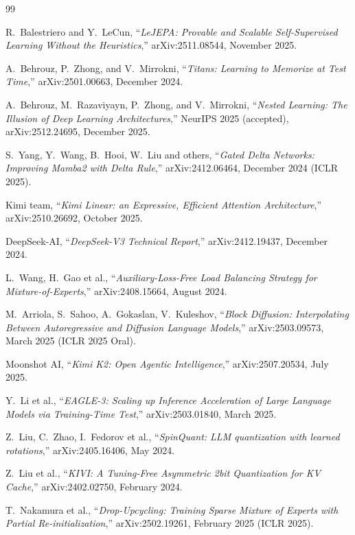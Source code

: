 \documentclass[10pt,a4paper]{article}
\theoremstyle{remark}
\begin{document}
\begin{thebibliography}{99}

R.~Balestriero and Y.~LeCun,
``\emph{LeJEPA: Provable and Scalable Self-Supervised Learning Without
the Heuristics},''
arXiv:2511.08544, November 2025.

A.~Behrouz, P.~Zhong, and V.~Mirrokni,
``\emph{Titans: Learning to Memorize at Test Time},''
arXiv:2501.00663, December 2024.

A.~Behrouz, M.~Razaviyayn, P.~Zhong, and V.~Mirrokni,
``\emph{Nested Learning: The Illusion of Deep Learning Architectures},''
NeurIPS 2025 (accepted), arXiv:2512.24695, December 2025.

S.~Yang, Y.~Wang, B.~Hooi, W.~Liu and others,
``\emph{Gated Delta Networks: Improving Mamba2 with Delta Rule},''
arXiv:2412.06464, December 2024 (ICLR 2025).

Kimi team,
``\emph{Kimi Linear: an Expressive, Efficient Attention Architecture},''
arXiv:2510.26692, October 2025.

DeepSeek-AI,
``\emph{DeepSeek-V3 Technical Report},''
arXiv:2412.19437, December 2024.

L.~Wang, H.~Gao et al.,
``\emph{Auxiliary-Loss-Free Load Balancing Strategy for Mixture-of-Experts},''
arXiv:2408.15664, August 2024.

M.~Arriola, S.~Sahoo, A.~Gokaslan, V.~Kuleshov,
``\emph{Block Diffusion: Interpolating Between Autoregressive and Diffusion
Language Models},''
arXiv:2503.09573, March 2025 (ICLR 2025 Oral).

Moonshot AI,
``\emph{Kimi K2: Open Agentic Intelligence},''
arXiv:2507.20534, July 2025.

Y.~Li et al.,
``\emph{EAGLE-3: Scaling up Inference Acceleration of Large Language Models
via Training-Time Test},''
arXiv:2503.01840, March 2025.

Z.~Liu, C.~Zhao, I.~Fedorov et al.,
``\emph{SpinQuant: LLM quantization with learned rotations},''
arXiv:2405.16406, May 2024.

Z.~Liu et al.,
``\emph{KIVI: A Tuning-Free Asymmetric 2bit Quantization for KV Cache},''
arXiv:2402.02750, February 2024.

T.~Nakamura et al.,
``\emph{Drop-Upcycling: Training Sparse Mixture of Experts with Partial
Re-initialization},''
arXiv:2502.19261, February 2025 (ICLR 2025).


\end{thebibliography}
\end{document}
